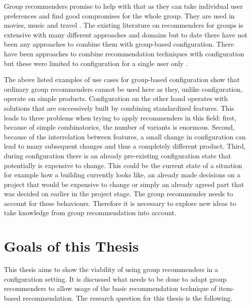 Group recommenders promise to help with that as they can take individual user preferences and find good compromises for the whole group. They are used in movies, music and travel \cite{garciaGroupRecommenderSystem2009, piliponyte2013sequential, peraGroupRecommenderMovies2013,felfernigGroupRecommenderApplications2018}. The existing literature on recommenders for groups is extensive with many different approaches and domains \cite{delicResearchMethodsGroup2016, chenInterfaceInteractionDesign2011, atasItemRecommendationUsing2017, jamesonRecommendationGroups2007, chenEmpatheticonsDesigningEmotion2014, liuCGSPAComprehensiveGroup2019} but to date there have not been any approaches to combine them with group-based configuration. There have been approaches to combine recommendation techniques with configuration but these were limited to configuration for a single user only \cite{pereiraFeatureBasedPersonalizedRecommender2016, scholzConfigurationbasedRecommenderSystem2017, scholzEffectsDecisionSpace2017}.


The above listed examples of use cases for group-based configuration show that ordinary group recommenders cannot be used here as they, unlike configuration, operate on simple products. Configuration on the other hand operates with solutions that are successively built by combining standardized features. This leads to three problems when trying to apply recommenders in this field: first, because of simple combinatorics, the number of variants is enormous. Second, because of the interrelation between features, a small change in configuration can lead to many subsequent changes and thus a completely different product. Third, during configuration there is an already pre-existing configuration state that potentially is expensive to change. This could be the current state of a situation for example how a building currently looks like, an already made decisions on a project that would be expensive to change or simply an already agreed part that was decided on earlier in the project stage. The group recommender needs to account for these behaviours. Therefore it is necessary to explore new ideas to take knowledge from group recommendation into account.

\section{Goals of this Thesis}
\label{sec:Introduction:Goals}

This thesis aims to show the viability of using group recommenders in a configuration setting. It is discussed what needs to be done to adapt group recommenders to allow usage of the basic recommendation technique of item-based recommendation. The research question for this thesis is the following.

